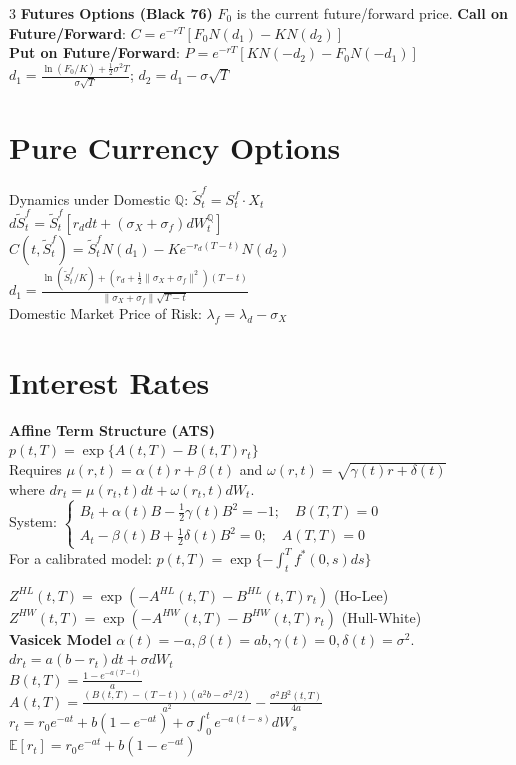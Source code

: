 \documentclass[8pt, a4paper, landscape]{extarticle}
\newcommand{\E}{\mathbb{E}}
\newcommand{\Q}{\mathbb{Q}}
\begin{document}
\begin{multicols*}{3}
\textbf{Futures Options (Black 76)} $F_0$ is the current future/forward price.
\textbf{Call on Future/Forward}: $C = e^{-rT} [F_0 N(d_1) - K N(d_2)]$ \\
\textbf{Put on Future/Forward}: $P = e^{-rT} [K N(-d_2) - F_0 N(-d_1)]$ \\
$d_1 = \frac{\ln(F_0/K) + \frac{1}{2}\sigma^2 T}{\sigma\sqrt{T}}$; \quad $d_2 = d_1 - \sigma\sqrt{T}$

\section*{Pure Currency Options}
Dynamics under Domestic $\Q$: $\tilde{S}_t^f = S_t^f \cdot X_t$ \\
$d\tilde{S}_t^f = \tilde{S}_t^f [r_d dt + (\sigma_X + \sigma_f) dW_t^\Q]$ \\
$C(t, \tilde{S}_t^f) = \tilde{S}_t^f N(d_1) - K e^{-r_d(T-t)} N(d_2)$ \\
$d_1 = \frac{\ln(\tilde{S}_t^f/K) + (r_d + \frac{1}{2}\|\sigma_X+\sigma_f\|^2)(T-t)}{\|\sigma_X+\sigma_f\|\sqrt{T-t}}$ \\
Domestic Market Price of Risk: $\lambda_f = \lambda_d - \sigma_X$

\section*{Interest Rates}
\textbf{Affine Term Structure (ATS)} \\
$p(t, T) = \exp\{A(t, T) - B(t, T)r_t\}$ \\
Requires $\mu(r, t) = \alpha(t)r + \beta(t)$ and $\omega(r, t) = \sqrt{\gamma(t)r + \delta(t)}$ \\
where $dr_t = \mu(r_t, t) dt + \omega(r_t, t)dW_t$. \\
System:
$\begin{cases} B_t + \alpha(t) B - \frac{1}{2} \gamma(t) B^2 = -1; \quad B(T, T)=0 \\ A_t - \beta(t) B + \frac{1}{2} \delta(t) B^2 = 0; \quad A(T, T)=0 \end{cases}$ \\
For a calibrated model: $p(t, T) = \exp\{-\int_t^T f^*(0, s) ds\}$

$Z^{HL}(t, T) = \exp(-A^{HL}(t,T) - B^{HL}(t,T)r_t)$ (Ho-Lee) \\
$Z^{HW}(t, T) = \exp(-A^{HW}(t,T) - B^{HW}(t,T)r_t)$ (Hull-White) \\

\textbf{Vasicek Model}
$\alpha(t)=-a, \beta(t)=ab, \gamma(t)=0, \delta(t)=\sigma^2$.\\
$dr_t = a(b-r_t)dt + \sigma dW_t$ \\
$B(t, T) = \frac{1-e^{-a(T-t)}}{a}$ \\
$A(t, T) = \frac{(B(t,T) - (T-t))(a^2b - \sigma^2/2)}{a^2} - \frac{\sigma^2 B^2(t,T)}{4a}$ \\
$ r_t = r_0 e^{-at} + b(1-e^{-at}) + \sigma \int_0^t e^{-a(t-s)} dW_s $ \\
$\E[r_t] = r_0 e^{-at} + b(1-e^{-at})$


\end{multicols*}
\end{document}
